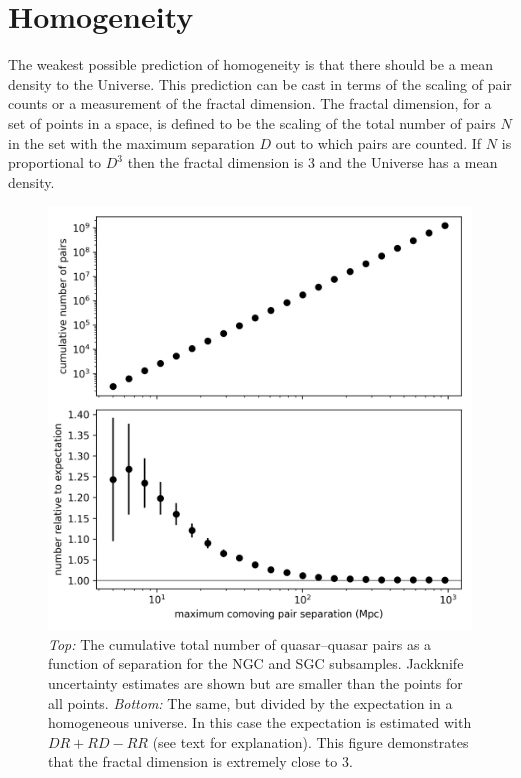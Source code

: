 \documentclass[modern]{aastex631}
\newlength{\figurewidth}
\begin{document}
\section{Homogeneity}

The weakest possible prediction of homogeneity is that there should be a mean density to the Universe.
This prediction can be cast in terms of the scaling of pair counts or a measurement of the fractal dimension.
The fractal dimension, for a set of points in a space, is defined to be the scaling of the total number of pairs $N$ in the set with the maximum separation $D$ out to which pairs are counted.
If $N$ is proportional to $D^3$ then the fractal dimension is 3 and the Universe has a mean density.

\begin{figure}[t!]
  \begin{mdframed}
  \color{captiongray}
  \begin{center}
    \includegraphics[width=\figurewidth]{notebooks/cumulativeDD_DR.png}
  \end{center}
    \caption{\textsl{Top:} The cumulative total number of quasar--quasar pairs as a function of separation for the NGC and SGC subsamples. Jackknife uncertainty estimates are shown but are smaller than the points for all points.
    \textsl{Bottom:} The same, but divided by the expectation in a homogeneous universe.
    In this case the expectation is estimated with $DR + RD - RR$ (see text for explanation).
    This figure demonstrates that the fractal dimension is extremely close to $3$.\label{fig:cumulative}}
  \end{mdframed}
\end{figure}
\end{document}
